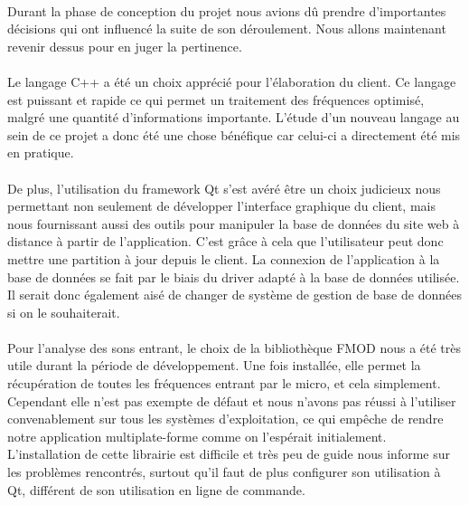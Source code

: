 \paragraph{}
Durant la phase de conception du projet nous avions dû prendre d'importantes décisions qui ont influencé la suite de son déroulement. Nous allons maintenant revenir dessus pour en juger la pertinence.

\paragraph{}
Le langage C++ a été un choix apprécié pour l'élaboration du client. Ce langage est puissant et rapide ce qui permet un 
traitement des fréquences optimisé, malgré une quantité d'informations importante. L'étude d'un nouveau langage au sein 
de ce projet a donc été une chose bénéfique car celui-ci a directement été mis en pratique. 

\paragraph{}
De plus, l'utilisation du framework Qt s'est avéré être un choix judicieux nous permettant non seulement de développer l'interface graphique du client, mais nous fournissant aussi des outils pour manipuler la base de données du site web à distance à partir de l'application. C'est grâce à cela que l'utilisateur peut donc mettre une partition à jour depuis le client. La connexion de l'application à la base de données se fait par le biais du driver adapté 
à la base de données utilisée. Il serait donc également aisé de changer de système de gestion de base de données si on le souhaiterait. 

\paragraph{}
Pour l'analyse des sons entrant, le choix de la bibliothèque FMOD nous a été très utile durant la période de développement. Une fois installée, 
elle permet la récupération de toutes les fréquences entrant par le micro, et cela simplement. \\
Cependant elle n'est pas exempte de défaut et nous n'avons pas réussi à l'utiliser convenablement sur tous les systèmes d'exploitation, ce qui empêche de rendre notre application multiplate-forme comme on l'espérait initialement. L'installation de cette librairie est difficile et 
très peu de guide nous informe sur les problèmes rencontrés, surtout qu'il faut de plus configurer son utilisation à Qt, différent de son utilisation 
en ligne de commande. 

